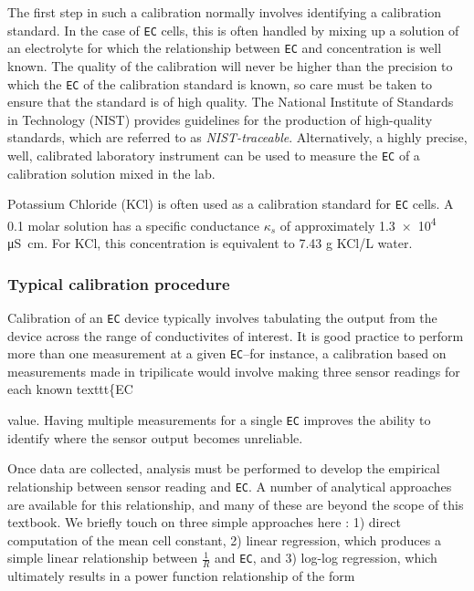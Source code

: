 {The first step in such a calibration normally involves identifying a calibration standard. In the case of \texttt{EC} cells, this is often handled by mixing up a solution of an electrolyte for which the relationship between \texttt{EC} and concentration is well known. The quality of the calibration will never be higher than the precision to which the \texttt{EC} of the calibration standard is known, so care must be taken to ensure that the standard is of high quality. The National Institute of Standards in Technology (NIST) provides guidelines for the production of high-quality standards, which are referred to as \emph{NIST-traceable}.  Alternatively, a highly precise, well, calibrated laboratory instrument can be used to measure the \texttt{EC} of a calibration solution mixed in the lab.  

\begin{kaobox}[frametitle=Mixing up an \texttt{EC} calibration fluid]
Potassium Chloride (KCl) is often used as a calibration standard for \texttt{EC} cells. A 0.1 molar solution has a specific conductance $\kappa_s$ of approximately \num{1.3e4} \si{\micro\siemens\cm}. For KCl, this concentration is equivalent to 7.43 g KCl/L water.
\end{kaobox}

\subsubsection{Typical calibration procedure}
Calibration of an \texttt{EC} device typically involves tabulating the output from the device across the range of conductivites of interest. It is good practice to perform more than one measurement at a given \texttt{EC}--for instance, a calibration based on measurements made in tripilicate would involve making three sensor readings for each known texttt\{EC} value. Having multiple measurements for a single \texttt{EC} improves the ability to identify where the sensor output becomes unreliable.

Once data are collected, analysis must be performed to develop the empirical relationship between sensor reading and \texttt{EC}. A number of analytical approaches are available for this relationship, and many of these are beyond the scope of this textbook. We briefly touch on three simple approaches here
: 1) direct computation of the mean cell constant, 2) linear regression, which produces a simple linear relationship between $\frac{1}{R}$ and \texttt{EC}, and 3) log-log regression, which ultimately results in a power function relationship of the form 

